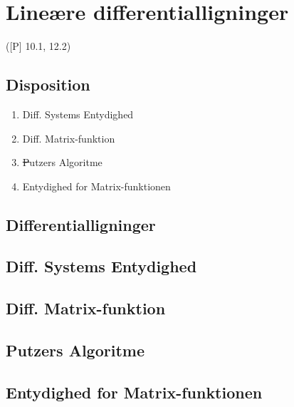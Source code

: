 \newpage
\chapter{Lineære differentialligninger}
([P] 10.1, 12.2)

\section*{Disposition}
\begin{enumerate}
	\item Diff. Systems Entydighed
	\item Diff. Matrix-funktion
	\item \sout Putzers Algoritme
	\item Entydighed for Matrix-funktionen 
\end{enumerate}

\section{Differentialligninger}


\section{Diff. Systems Entydighed}


\section{Diff. Matrix-funktion}


\section*{Putzers Algoritme}


\section{Entydighed for Matrix-funktionen}


